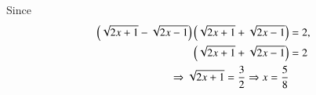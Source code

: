 Since 
%
\begin{align}
\left(\sqrt{2x+1}-\sqrt{2x-1}\right)\left(\sqrt{2x+1}+\sqrt{2x-1}\right) &= 2, \nonumber \\
\left(\sqrt{2x+1}+\sqrt{2x-1}\right) &= 2 \nonumber \\
\Rightarrow \sqrt{2x+1} = \frac{3}{2} \Rightarrow x = \frac{5}{8}
\end{align}
%





